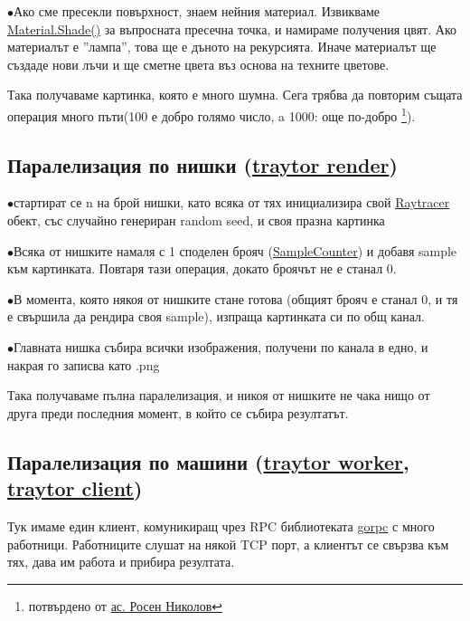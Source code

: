\documentclass[12pt]{extarticle}
\newlength{\bulletwidth}\settowidth{\bulletwidth}{$\bullet$}
\newcommand{\mitem}{\vspace{5mm}\setlength{\leftskip}{\leftmargin}\hspace*{-\labelsep}\hspace*{-\bulletwidth}$\bullet$\hspace*{\labelsep}}
\newcommand{\mend}{\setlength{\leftskip}{0cm}\vspace{5mm}}
\begin{document}
	\mitem Ако сме пресекли повърхност, знаем нейния материал.
	Извикваме \href{https://godoc.org/github.com/DexterLB/traytor/materials#Material}{Material.Shade()} за въпросната пресечна точка,
	и намираме получения цвят. Ако материалът е ''лампа'', това ще
	е дъното на рекурсията. Иначе материалът ще създаде нови лъчи
	и ще сметне цвета въз основа на техните цветове.

	\mend

Така получаваме картинка, която е много шумна. Сега трябва да повторим
същата операция много  пъти(100 е добро голямо число, a 1000: още по-добро \footnote{потвърдено от \href{https://www.fmi.uni-sofia.bg/bg/lecturers/ma/rnikolov}{ас. Росен Николов}}).

\subsection{Паралелизация по нишки (\href{https://github.com/DexterLB/traytor/blob/master/cmd/traytor/render.go}{traytor render})}

	\mitem стартират се n на брой нишки, като всяка
от тях инициализира свой \href{https://godoc.org/github.com/DexterLB/traytor/raytracer#Raytracer}{Raytracer} обект, със случайно генериран
random seed, и своя празна картинка

	\mitem Всяка от нишките намаля с 1 споделен брояч (\href{https://godoc.org/github.com/DexterLB/traytor/rpc#SampleCounter}{SampleCounter}) и добавя sample към картинката. Повтаря тази
	операция, докато броячът не е станал 0.
	
	\mitem В момента, която някоя от нишките стане готова (общият
	брояч е станал 0, и тя е свършила да рендира своя sample),
	изпраща картинката си по общ канал.
	
	\mitem Главната нишка събира всички изображения, получени по
	канала в едно, и накрая го записва като .png
	
	\mend
	
Така получаваме пълна паралелизация, и никоя от нишките не чака нищо
от друга преди последния момент, в който се събира резултатът.

\pagebreak
\subsection{Паралелизация по машини (\href{https://github.com/DexterLB/traytor/blob/master/cmd/traytor/worker.go}{traytor worker}, \href{https://github.com/DexterLB/traytor/blob/master/cmd/traytor/client.go}{traytor client})}
Тук имаме един клиент, комуникиращ чрез RPC библиотеката \href{https://godoc.org/github.com/valyala/gorpc}{gorpc} с много работници. Работниците слушат на някой TCP порт, а клиентът се 
свързва към тях, дава им работа и прибира резултата.
\end{document}
